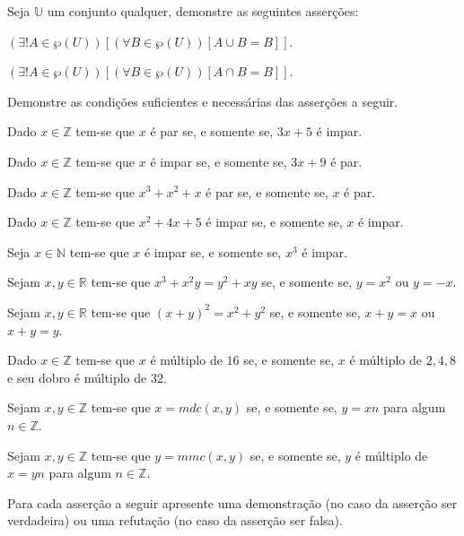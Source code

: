 \begin{questao}\label{test:Demosntracoes15}
	Seja $\mathbb{U}$ um conjunto qualquer, demonstre as seguintes asserções:
\end{questao}

\begin{exerList}
	\item $(\exists! A \in \wp(U))[(\forall B \in \wp(U))[A \cup B = B]]$.
	\item $(\exists! A \in \wp(U))[(\forall B \in \wp(U))[A \cap B = B]]$.
\end{exerList}

\begin{questao}\label{test:Demosntracoes16}
	Demonstre as condições suficientes e necessárias das asserções a seguir.
\end{questao}

\begin{exerList}
	\item Dado $x \in \mathbb{Z}$ tem-se que $x$ é par se, e somente se, $3x + 5$ é impar.
	\item Dado $x \in \mathbb{Z}$ tem-se que $x$ é impar se, e somente se, $3x + 9$ é par.
	\item Dado $x \in \mathbb{Z}$ tem-se que $x^3 + x^2 + x$ é par se, e somente se, $x$ é par.
	\item Dado $x \in \mathbb{Z}$ tem-se que $x^2 + 4x + 5$ é impar se, e somente se, $x$ é impar.
	\item Seja $x \in \mathbb{N}$ tem-se que $x$ é impar se, e somente se, $x^3$ é impar.
	\item Sejam $x, y \in \mathbb{R}$ tem-se que $x^3 + x^2y = y^2 + xy$ se, e somente se, $y = x^2$ ou $y = -x$.
	\item Sejam $x, y \in \mathbb{R}$ tem-se que $(x + y)^2 = x^2 + y^2$ se, e somente se, $x + y = x$ ou $x + y = y$.
	\item Dado $x \in \mathbb{Z}$ tem-se que $x$ é múltiplo de $16$ se, e somente se, $x$ é múltiplo de $2, 4, 8$ e seu dobro é múltiplo de $32$.
	\item Sejam $x, y \in \mathbb{Z}$ tem-se que $x = mdc(x, y)$ se, e somente se, $y = xn$ para algum $n \in \mathbb{Z}$.
	\item Sejam $x, y \in \mathbb{Z}$ tem-se que $y = mmc(x, y)$ se, e somente se, $y$ é múltiplo de $x = yn$ para algum $n \in \mathbb{Z}$.
\end{exerList}

\begin{questao}\label{test:Demosntracoes17}
	Para cada asserção a seguir apresente uma demonstração (no caso da asserção ser verdadeira) ou uma refutação (no caso da asserção ser falsa).
\end{questao}

